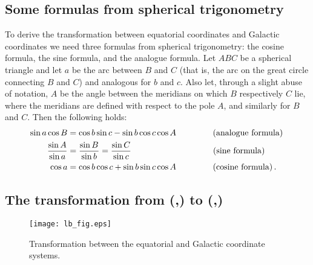 \subsection{Some formulas from spherical trigonometry}

To derive the transformation between equatorial coordinates and
Galactic coordinates we need three formulas from spherical
trigonometry: the cosine formula, the sine formula, and the analogue
formula. Let $ABC$ be a spherical triangle and let $a$ be the arc
between $B$ and $C$ (that is, the arc on the great circle connecting
$B$ and $C$) and analogous for $b$ and $c$. Also let, through a slight
abuse of notation, $A$ be the angle between the meridians on which $B$
respectively $C$ lie, where the meridians are defined with respect to
the pole $A$, and similarly for $B$ and $C$. Then the following holds:
\begin{align}
\sin a \cos B & = \cos b \sin c - \sin b \cos c \cos A\, \qquad \qquad \, \textnormal{(analogue formula)}\,\label{eq:analogue}\\
\frac{\sin A}{\sin a} & = \frac{\sin B}{\sin b} = \frac{\sin C}{\sin c} \ \ \quad\qquad \qquad\qquad \qquad \textnormal{(sine formula)}\,\label{eq:sineform}\\
\cos a &= \cos b \cos c + \sin b \sin c \cos A\qquad \qquad\ \textnormal{(cosine formula)}\label{eq:cosineform}\, .
\end{align}



\subsection{The transformation from (\ra,\dec) to (\gall,\galb)}

\begin{figure}[htp]
\begin{center}
\texttt{[image: lb\_fig.eps]}
\caption{Transformation between the equatorial and Galactic coordinate
  systems.}\label{fig:lb}
\end{center}
\end{figure}


